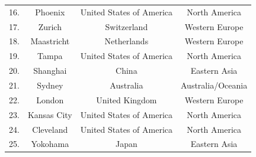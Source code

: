 \begin{table}[h]
\begin{scriptsize}
\begin{tabular}{|l|c|c|c|}
	 16. & Phoenix 			& United States of America  		& North America    		\\ 
	 17. & Zurich 			& Switzerland 						& Western Europe  		\\
	 18. & Maastricht 		& Netherlands  						& Western Europe   		\\
	 19. & Tampa 			& United States of America  		& North America   		\\
	 20. & Shanghai 		& China 							& Eastern Asia  		\\
	 21. & Sydney 			& Australia 						& Australia/Oceania		\\
	 22. & London 			& United Kingdom  					& Western Europe 		\\
	 23. & Kansas City 		& United States of America  		& North America 		\\
	 24. & Cleveland 		& United States of America  		& North America   		\\
	 25. & Yokohama 		& Japan  							& Eastern Asia  		\\
	\hline
	\end{tabular} 
	\end{scriptsize}
	\label{tab:appendix-B-increasing}
\end{table}


